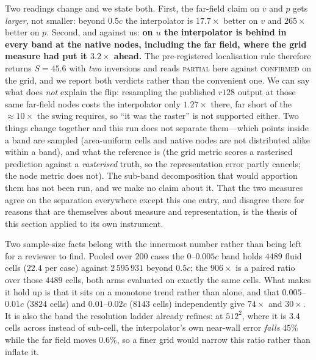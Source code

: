 Two readings change and we state both. First, the far-field claim on $v$ and $p$ gets
\emph{larger}, not smaller: beyond $0.5c$ the interpolator is $17.7\times$ better on $v$
and $265\times$ better on $p$. Second, and against us: \textbf{on $u$ the interpolator is
behind in every band at the native nodes, including the far field, where the grid measure
had put it $3.2\times$ ahead.} The pre-registered localisation rule therefore returns
$S=45.6$ with \emph{two} inversions and reads \textsc{partial} here against
\textsc{confirmed} on the grid, and we report both verdicts rather than the convenient one.
We can say what does \emph{not} explain the flip: resampling the published $r128$ output at
those same far-field nodes costs the interpolator only $1.27\times$ there, far short of the
$\approx10\times$ the swing requires, so ``it was the raster'' is not supported either. Two
things change together and this run does not separate them---which points inside a band are
sampled (area-uniform cells and native nodes are not distributed alike within a band), and
what the reference is (the grid metric scores a rasterised prediction against a
\emph{rasterised} truth, so the representation error partly cancels; the node metric does
not). The sub-band decomposition that would apportion them has not been run, and we make no
claim about it. That the two measures agree on the separation everywhere except this one
entry, and disagree there for reasons that are themselves about measure and representation,
is the thesis of this section applied to its own instrument.

Two sample-size facts belong with the innermost number rather than being left for a
reviewer to find. Pooled over $200$ cases the $0$--$0.005c$ band holds $4489$ fluid cells
($22.4$ per case) against $2\,595\,931$ beyond $0.5c$; the $906\times$ is a paired ratio
over those $4489$ cells, both arms evaluated on exactly the same cells. What makes it hold
up is that it sits on a monotone trend rather than alone, and that $0.005$--$0.01c$ ($3824$
cells) and $0.01$--$0.02c$ ($8143$ cells) independently give $74\times$ and $30\times$. It
is also the band the resolution ladder already refines: at $512^2$, where it is $3.4$ cells
across instead of sub-cell, the interpolator's own near-wall error \emph{falls} $45\%$
while the far field moves $0.6\%$, so a finer grid would narrow this ratio rather than
inflate it.

